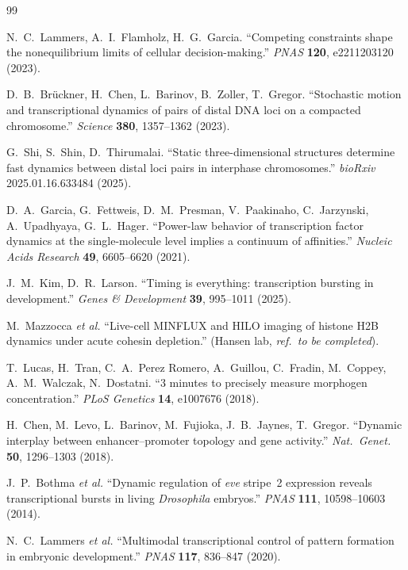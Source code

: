 \documentclass[11pt]{article}
\begin{document}
\begin{thebibliography}{99}

N.~C.~Lammers, A.~I.~Flamholz, H.~G.~Garcia. ``Competing constraints shape
the nonequilibrium limits of cellular decision-making.''
\textit{PNAS} \textbf{120}, e2211203120 (2023).

D.~B.~Br\"uckner, H.~Chen, L.~Barinov, B.~Zoller, T.~Gregor. ``Stochastic
motion and transcriptional dynamics of pairs of distal DNA loci on a
compacted chromosome.'' \textit{Science} \textbf{380}, 1357--1362 (2023).

G.~Shi, S.~Shin, D.~Thirumalai. ``Static three-dimensional structures
determine fast dynamics between distal loci pairs in interphase
chromosomes.'' \textit{bioRxiv} 2025.01.16.633484 (2025).

D.~A.~Garcia, G.~Fettweis, D.~M.~Presman, V.~Paakinaho, C.~Jarzynski,
A.~Upadhyaya, G.~L.~Hager. ``Power-law behavior of transcription factor
dynamics at the single-molecule level implies a continuum of affinities.''
\textit{Nucleic Acids Research} \textbf{49}, 6605--6620 (2021).

J.~M.~Kim, D.~R.~Larson. ``Timing is everything: transcription bursting
in development.'' \textit{Genes \& Development} \textbf{39}, 995--1011
(2025).

M.~Mazzocca \textit{et al.} ``Live-cell MINFLUX and HILO imaging of
histone H2B dynamics under acute cohesin depletion.'' (Hansen lab,
\textit{ref.\ to be completed}).

T.~Lucas, H.~Tran, C.~A.~Perez Romero, A.~Guillou, C.~Fradin, M.~Coppey,
A.~M.~Walczak, N.~Dostatni. ``3 minutes to precisely measure morphogen
concentration.'' \textit{PLoS Genetics} \textbf{14}, e1007676 (2018).

H.~Chen, M.~Levo, L.~Barinov, M.~Fujioka, J.~B.~Jaynes, T.~Gregor.
``Dynamic interplay between enhancer--promoter topology and gene
activity.'' \textit{Nat.\ Genet.} \textbf{50}, 1296--1303 (2018).

J.~P.~Bothma \textit{et al.} ``Dynamic regulation of \textit{eve} stripe~2
expression reveals transcriptional bursts in living \textit{Drosophila}
embryos.'' \textit{PNAS} \textbf{111}, 10598--10603 (2014).

N.~C.~Lammers \textit{et al.} ``Multimodal transcriptional control of
pattern formation in embryonic development.''
\textit{PNAS} \textbf{117}, 836--847 (2020).


\end{thebibliography}
\end{document}

